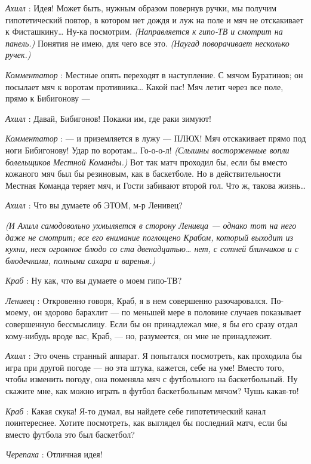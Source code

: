 \emph{Ахилл} : Идея! Может быть, нужным образом повернув ручки, мы получим гипотетический повтор, в котором нет дождя и луж на поле и мяч не отскакивает к Фисташкину\ldots{} Ну-ка посмотрим. \emph{(Направляется к гипо-ТВ и смотрит на панель.)} Понятия не имею, для чего все это. \emph{(Наугад поворачивает несколько ручек.)}

\emph{Комментатор} : Местные опять переходят в наступление. С мячом Буратинов; он посылает мяч к воротам противника\ldots{} Какой пас! Мяч летит через все поле, прямо к Бибигонову ---

\emph{Ахилл} : Давай, Бибигонов! Покажи им, где раки зимуют!

\emph{Комментатор} : --- и приземляется в лужу --- ПЛЮХ! Мяч отскакивает прямо под ноги Бибигонову! Удар по воротам\ldots{} Го-о-о-л! \emph{(Слышны восторженные вопли болельщиков Местной Команды.)} Вот так матч проходил бы, если бы вместо кожаного мяч был бы резиновым, как в баскетболе. Но в действительности Местная Команда теряет мяч, и Гости забивают второй гол. Что ж, такова жизнь\ldots{}

\emph{Ахилл} : Что вы думаете об ЭТОМ, м-р Ленивец?

\emph{(И Ахилл самодовольно ухмыляется в сторону Ленивца --- однако тот на него даже не смотрит; все его внимание поглощено Крабом, который выходит из кухни, неся огромное блюдо со ста двенадцатью\ldots{} нет, с сотней блинчиков и с блюдечками, полными сахара и варенья.)}

\emph{Краб} : Ну как, что вы думаете о моем гипо-ТВ?

\emph{Ленивец} : Откровенно говоря, Краб, я в нем совершенно разочаровался. По-моему, он здорово барахлит --- по меньшей мере в половине случаев показывает совершенную бессмыслицу. Если бы он принадлежал мне, я бы его сразу отдал кому-нибудь вроде вас, Краб, --- но, разумеется, он мне не принадлежит.

\emph{Ахилл} : Это очень странный аппарат. Я попытался посмотреть, как проходила бы игра при другой погоде --- но эта штука, кажется, себе на уме! Вместо того, чтобы изменить погоду, она поменяла мяч с футбольного на баскетбольный. Ну скажите мне, как можно играть в футбол баскетбольным мячом? Чушь какая-то!

\emph{Краб} : Какая скука! Я-то думал, вы найдете себе гипотетический канал поинтереснее. Хотите посмотреть, как выглядел бы последний матч, если бы вместо футбола это был баскетбол?

\emph{Черепаха} : Отличная идея!

